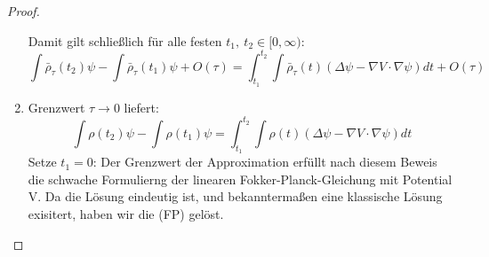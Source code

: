 \documentclass[11pt,a4paper,notitlepage]{scrreprt}
\begin{document}
\begin{proof}
\begin{enumerate}
Damit gilt schließlich für alle festen $t_1,~t_2\in [0,\infty)$:
\begin{equation}
\int\bar\rho_\tau(t_2)\psi-\int\bar\rho_\tau(t_1)\psi+O(\tau)=\int_{t_1}^{t_2}\int\bar\rho_\tau(t)(\Delta\psi-\nabla V\cdot\nabla\psi)dt+O(\tau)
\end{equation}
\item Grenzwert $\tau\to 0$ liefert:
\begin{equation}
\int\rho(t_2)\psi-\int\rho(t_1)\psi=\int_{t_1}^{t_2}\int\rho(t)(\Delta\psi-\nabla V\cdot\nabla\psi)dt
\end{equation}
Setze $t_1=0$: Der Grenzwert der Approximation erfüllt nach diesem Beweis die schwache Formulierng der linearen Fokker-Planck-Gleichung mit Potential V. Da die Lösung eindeutig ist, und bekanntermaßen eine klassische Lösung exisitert, haben wir die (FP) gelöst. 


\end{enumerate}
\end{proof}
\end{document}
